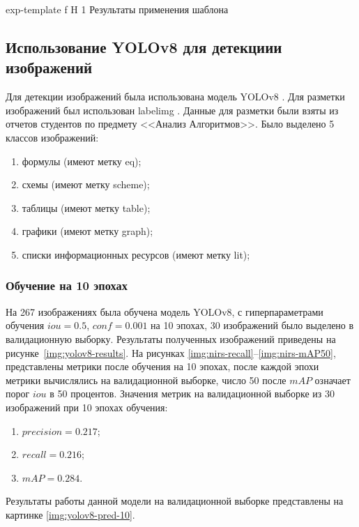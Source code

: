 {exp-template} %
{f} %
{H} %
{1\textwidth} %
{Результаты применения шаблона} %



\subsection{Использование YOLOv8 для детекциии изображений}
Для детекции изображений была использована модель YOLOv8 \cite{YOLOv8}. Для разметки изображений был использован labelimg \cite{labelimg}. Данные для разметки были взяты из отчетов студентов по предмету <<Анализ Алгоритмов>>.
Было выделено 5 классов изображений:
\begin{enumerate}
	\item формулы (имеют метку eq);
	\item схемы (имеют метку scheme);
	\item таблицы (имеют метку table);
	\item графики (имеют метку graph);
	\item списки информационных ресурсов (имеют метку lit);
\end{enumerate}

\subsubsection{Обучение на 10 эпохах}
На 267 изображениях была обучена модель YOLOv8, с гиперпараметрами обучения $iou=0.5$, $conf=0.001$ на 10 эпохах, 30 изображений было выделено в валидационную выборку.
Результаты полученных изображений приведены на рисунке~\ref{img:yolov8-results}.
На рисунках \ref{img:nirs-recall}--\ref{img:nirs-mAP50}, представлены метрики после обучения на 10 эпохах, 
после каждой эпохи метрики вычислялись на валидационной выборке,
число 50 после $mAP$  означает порог $iou$ в 50 процентов.
Значения метрик  на валидационной выборке из 30 изображений при 10 эпохах обучения:
\begin{enumerate}
	\item $precision=0.217$;
	\item $recall=0.216$;
	\item $mAP=0.284$.
\end{enumerate}
Результаты работы данной модели на валидационной выборке представлены на картинке \ref{img:yolov8-pred-10}.


